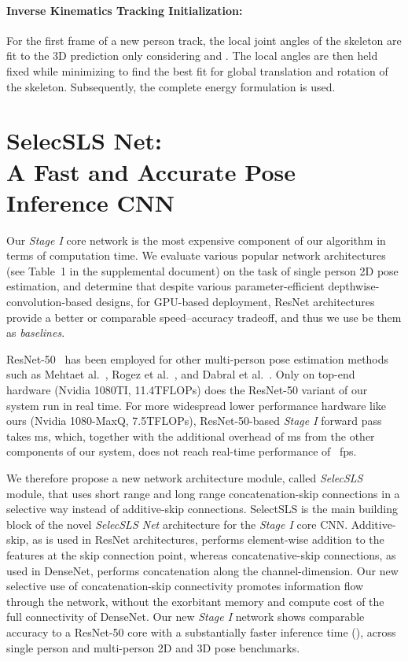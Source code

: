 \documentclass[acmtog,authorversion]{acmart}
\newcommand{\etal}{et al.}
\begin{document}
\paragraph{Inverse Kinematics Tracking Initialization:}
For the first frame of a new person track, the local joint angles of the skeleton are fit to the 3D prediction only considering  and . The local angles are then held fixed while minimizing  to find the best fit for global translation and rotation of the skeleton. Subsequently, the complete energy formulation  is used. 



\section{SelecSLS Net:\\ A Fast and Accurate Pose Inference CNN}
\label{sec:dlnas}
Our \textit{Stage I} core network is the most expensive component of our algorithm in terms of computation time. 
We evaluate various popular network architectures (see Table~1 in the supplemental document) on the task of single person 2D pose estimation, and determine that despite various parameter-efficient depthwise-convolution-based designs, for GPU-based deployment, ResNet architectures provide a better or comparable speed--accuracy tradeoff, and thus we use be them as \emph{baselines}.


ResNet-50~ 
has been employed for other multi-person pose estimation methods such as Mehta\etal~, Rogez \etal~, and Dabral \etal~. 
Only on top-end hardware (Nvidia 1080TI, 11.4TFLOPs) does the ResNet-50 variant of our system run in real time. For more widespread lower performance hardware like ours (Nvidia 1080-MaxQ, 7.5TFLOPs), ResNet-50-based \textit{Stage I} forward pass takes ms, which, together with the additional overhead of ms from the other components of our system, does not reach real-time performance of ~fps.


 We therefore propose a new network architecture module, called \textit{SelecSLS} module, that uses short range and long range concatenation-skip connections in a selective way instead of additive-skip connections.  
SelectSLS is the main building block of the novel \textit{SelecSLS Net} architecture for the \textit{Stage I} core CNN. 
Additive-skip, as is used in ResNet architectures, performs element-wise addition to the features at the skip connection point, whereas concatenative-skip connections, as used in DenseNet, performs concatenation along the channel-dimension. 
Our new selective use of concatenation-skip connectivity promotes information flow through the network, without the exorbitant memory and compute cost of the full connectivity of DenseNet. 
Our new \textit{Stage I} network shows comparable accuracy to a ResNet-50 core with a substantially faster inference time (), across single person and multi-person 2D and 3D pose benchmarks. 
\end{document}
